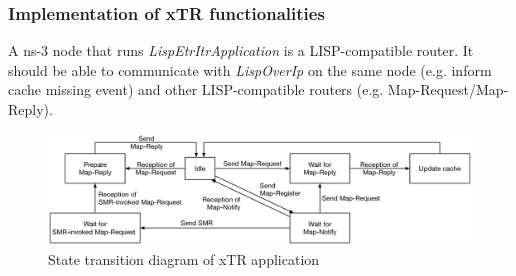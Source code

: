 \subsubsection{Implementation of xTR functionalities}
A ns-3 node that runs \emph{LispEtrItrApplication} is a LISP-compatible router. It should be able to communicate with \emph{LispOverIp} on the same node (e.g. inform cache missing event) and other LISP-compatible routers (e.g. Map-Request/Map-Reply). 
\begin{figure}[!t]
	\centering
	\includegraphics[width=\textwidth]{Pics/xTR_state_transition.eps}
	\caption{State transition diagram of xTR application} %
	\label{fig:xTR-state-transition}
\end{figure}
